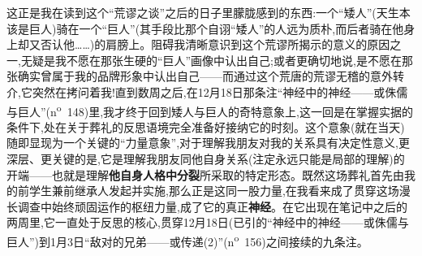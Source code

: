 这正是我在读到这个“荒谬之谈”之后的日子里朦胧感到的东西:一个“矮人”(天生本该是巨人)骑在一个“巨人”(其手段比那个自诩“矮人”的人远为质朴,而后者骑在他身上却又否认他……)的肩膀上。阻碍我清晰意识到这个荒谬所揭示的意义的原因之一\dmark{},无疑是我不愿在那张生硬的“巨人”画像中认出自己;或者更确切地说,是不愿在那张确实曾属于我的品牌形象中认出自己——而通过这个荒唐的荒谬无稽的意外转介,它突然在拷问着我!直到数周之后,在12月18日那条注“神经中的神经——或侏儒与巨人”(n\textsuperscript{o}~148)里,我才终于回到矮人与巨人的奇特意象上,这一回是在掌握实据的条件下,处在关于葬礼的反思语境完全准备好接纳它的时刻。这个意象(就在当天)随即显现为一个关键的“力量意象”,对于理解我朋友对我的关系具有决定性意义,更深层、更关键的是,它是理解我朋友同他自身关系(注定永远只能是局部的理解)的开端——也就是理解\textbf{他自身人格中分裂}所采取的特定形态。既然这场葬礼首先由我的前学生兼前继承人发起并实施,那么正是这同一股力量,在我看来成了贯穿这场漫长调查中始终顽固运作的枢纽力量,成了它的真正\textbf{神经}。在它出现在笔记中之后的两周里,它一直处于反思的核心,贯穿12月18日(已引的“神经中的神经——或侏儒与巨人”)到1月3日“敌对的兄弟——或传递(2)”(n\textsuperscript{o}~156)之间接续的九条注。

